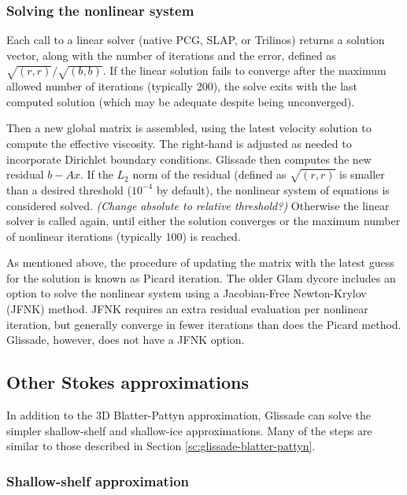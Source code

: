 \subsubsection{Solving the nonlinear system}

Each call to a linear solver (native PCG, SLAP, or Trilinos) returns a solution vector,
along with the number of iterations and the error, defined as $\sqrt{(r,r)}/\sqrt{(b,b)}$.
If the linear solution fails to converge after the maximum allowed number of iterations
(typically 200), the solve exits with the last computed solution (which may be adequate
despite being unconverged).

Then a new global matrix is assembled, using the latest velocity solution to compute 
the effective viscosity.  The right-hand is adjusted as needed to incorporate Dirichlet
boundary conditions.  Glissade then computes the new residual $b - Ax$.  If the $L_2$ norm of the
residual (defined as $\sqrt{(r,r)}$ is smaller than a desired threshold ($10^{-4}$ by default),
the nonlinear system of equations is considered solved.
\textit{(Change absolute to relative threshold?)}
Otherwise the linear solver is called again, until either the solution converges or the 
maximum number of nonlinear iterations (typically 100) is reached.

As mentioned above, the procedure of updating the matrix with the latest guess for the solution
is known as Picard iteration.  The older Glam dycore includes an option
to solve the nonlinear system using a Jacobian-Free Newton-Krylov (JFNK) method.
JFNK requires an extra residual evaluation per nonlinear iteration, but generally
converge in fewer iterations than does the Picard method.  Glissade, however, does not
have a JFNK option.


\subsection{Other Stokes approximations}
\label{sc:glissade-other-approx}

In addition to the 3D Blatter-Pattyn approximation, Glissade can solve the simpler shallow-shelf
and shallow-ice approximations.  Many of the steps are similar to those described in
Section \ref{sc:glissade-blatter-pattyn}.

\subsubsection{Shallow-shelf approximation}

